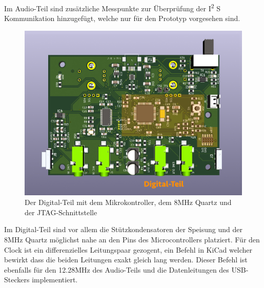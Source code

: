 Im Audio-Teil sind zusätzliche Messpunkte zur Überprüfung der I\textsuperscript{2} S Kommunikation hinzugefügt, welche nur für den Prototyp vorgesehen sind. 

\begin{figure} [H]
\begin{center}
 \includegraphics[scale=0.37]{../graphics/PCB-Layout_DGTL.jpg}
 \caption{Der Digital-Teil mit dem Mikrokontroller, dem 8MHz Quartz und der JTAG-Schnittstelle}
\label{fig:PCB_DGTL}
\end{center}
\end{figure}

Im Digital-Teil sind vor allem die Stützkondensatoren der Speisung und der 8MHz Quartz möglichst nahe an den Pins des Microcontrollers platziert. Für den Clock ist ein differenzielles Leitungspaar gezogent, ein Befehl in KiCad welcher bewirkt dass die beiden Leitungen exakt gleich lang werden. Dieser Befehl ist ebenfalls für den 12.28MHz des Audio-Teils und die Datenleitungen des USB-Steckers implementiert.

